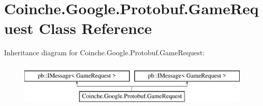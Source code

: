 \hypertarget{class_coinche_1_1_google_1_1_protobuf_1_1_game_request}{}\section{Coinche.\+Google.\+Protobuf.\+Game\+Request Class Reference}
\label{class_coinche_1_1_google_1_1_protobuf_1_1_game_request}
Inheritance diagram for Coinche.\+Google.\+Protobuf.\+Game\+Request\+:\begin{figure}[H]
\begin{center}
\leavevmode
\includegraphics[height=2.000000cm]{class_coinche_1_1_google_1_1_protobuf_1_1_game_request}
\end{center}
\end{figure}
